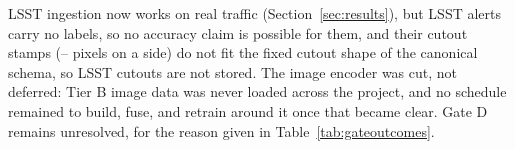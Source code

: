 LSST ingestion now works on real traffic (Section~\ref{sec:results}), but
LSST alerts carry no labels, so no accuracy claim is possible for them,
and their cutout stamps (\LsstArchiveStampMin{}--\LsstArchiveStampMax{}
pixels on a side) do not fit the fixed cutout shape of the canonical
schema, so LSST cutouts are not stored. The image encoder was cut, not
deferred: Tier B image data was never loaded across the project, and no
schedule remained to build, fuse, and retrain around it once that became
clear. Gate D remains unresolved, for the reason given in
Table~\ref{tab:gateoutcomes}.

